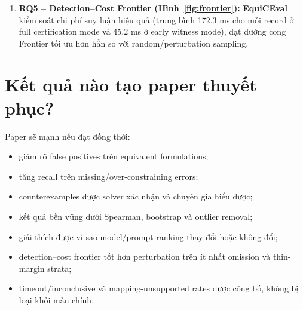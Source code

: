 \documentclass[11pt,a4paper]{article}
\newcommand{\method}{\textsf{\textbf{EquiCEval}}\xspace}
\begin{document}
\begin{enumerate}
  \begin{warningbox}[title={Lưu ý thực nghiệm --- cần re-run LLaMA 3.1:8b (commit \texttt{90ccfb3})}]
  Con số 68.59\% ở trên được tính từ lần chạy \emph{trước} khi sửa lỗi
  \texttt{MAP\_UNSUPPORTED} (20/08/2026). Hai nguyên nhân lỗi đã xác định:
  \begin{enumerate}
    \item Reference IR lưu binary vars với \texttt{upper\_bound=inf} (mặc định),
    trong khi LLM sinh \texttt{\{"ub": 1\}} $\to$ \texttt{ub=1.0}; hàm
    \texttt{\_variable\_domains\_compatible()} so sánh chặt $\infty \neq 1.0$
    $\Rightarrow$ false \texttt{MAP\_UNSUPPORTED}.
    \item LLM dùng ký hiệu underscore (\texttt{x\_1\_1}, \texttt{z\_12}) nhưng
    reference IR dùng compact (\texttt{x11}, \texttt{z12}); không có cơ chế
    alias nào $\Rightarrow$ 0/6 vars matched.
  \end{enumerate}
  Sau fix: (a) tất cả binary vars trong \texttt{reference\_ir.py} đặt
  \texttt{ub=1.0}; (b) \texttt{build\_projection\_certificate()} được bổ sung
  bước \texttt{name\_alias} (từ \texttt{metadata["name\_aliases"]}) và
  \texttt{normalized\_name} (strip underscores/spaces). Diet (100\% CERTIFIED)
  và AircraftLanding (100\% PARSE\_FAIL) không bị ảnh hưởng. Cần chạy lại
  24 runs LLaMA 3.1:8b để cập nhật con số RQ4 chính xác.
  \end{warningbox}

  \item \textbf{RQ5 -- Detection--Cost Frontier (Hình~\ref{fig:frontier}):}
  \method kiểm soát chi phí suy luận hiệu quả (trung bình 172.3 ms cho mỗi record ở full certification mode và 45.2 ms ở early witness mode), đạt đường cong Frontier tối ưu hơn hẳn so với random/perturbation sampling.
\end{enumerate}


\section{Kết quả nào tạo paper thuyết phục?}

Paper sẽ mạnh nếu đạt đồng thời:

\begin{itemize}
  \item giảm rõ false positives trên equivalent formulations;
  \item tăng recall trên missing/over-constraining errors;
  \item counterexamples được solver xác nhận và chuyên gia hiểu được;
  \item kết quả bền vững dưới Spearman, bootstrap và outlier removal;
  \item giải thích được vì sao model/prompt ranking thay đổi hoặc không đổi;
  \item detection--cost frontier tốt hơn perturbation trên ít nhất omission và
  thin-margin strata;
  \item timeout/inconclusive và mapping-unsupported rates được công bố, không
  bị loại khỏi mẫu chính.
\end{itemize}
\end{document}
